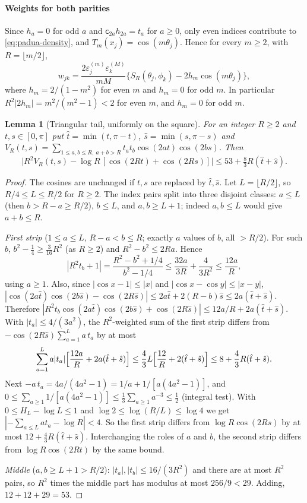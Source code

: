 \documentclass[preprint,12pt,a4paper]{elsarticle}
\newtheorem{lemma}[theorem]{Lemma}
\theoremstyle{remark}
\begin{document}
\paragraph{Weights for both parities}
Since $h_a=0$ for odd $a$ and $\mathsf c_{2a}h_{2a}=t_a$ for $a\ge0$, only even
indices contribute to \eqref{eq:padua-density}, and
$T_m(x_j)=\cos(m\theta_j)$. Hence for every $m\ge2$, with
$R=\lfloor m/2\rfloor$,
\begin{equation}\label{eq:weight-both}
 w_{jk}=\frac{2\varepsilon^{(m)}_j\varepsilon^{(M)}_k}{mM}
 \bigl\{S_R(\theta_j,\phi_k)-2h_m\cos(m\theta_j)\bigr\},
\end{equation}
where $h_m=2/(1-m^2)$ for even $m$ and $h_m=0$ for odd $m$.
In particular $R^2|2h_m|=m^2/(m^2-1)<2$ for even $m$, and $h_m=0$ for odd $m$.

\begin{lemma}[Triangular tail, uniformly on the square]\label{lem:triangular-tail}
For an integer $R\ge2$ and $t,s\in[0,\pi]$ put $\hat t=\min(t,\pi-t)$,
$\hat s=\min(s,\pi-s)$ and
$V_R(t,s)=\sum_{1\le a,b\le R,\ a+b>R}t_at_b\cos(2at)\cos(2bs)$. Then
\[
 \bigl|R^2V_R(t,s)-\log R\,[\cos(2Rt)+\cos(2Rs)]\bigr|\le53+\tfrac83R(\hat t+\hat s).
\]
\end{lemma}
\begin{proof}
The cosines are unchanged if $t,s$ are replaced by $\hat t,\hat s$.
Let $L=\lfloor R/2\rfloor$, so $R/4\le L\le R/2$ for $R\ge2$. The index
pairs split into three disjoint classes: $a\le L$ (then $b>R-a\ge R/2$),
$b\le L$, and $a,b\ge L+1$; indeed $a,b\le L$ would give $a+b\le R$.

\emph{First strip} ($1\le a\le L$, $R-a<b\le R$; exactly $a$ values of $b$,
all $>R/2$). For such $b$, $b^2-\frac14\ge\frac3{16}R^2$ (as $R\ge2$) and
$R^2-b^2\le2Ra$. Hence
\[
 |R^2t_b+1|=\frac{R^2-b^2+1/4}{b^2-1/4}\le\frac{32a}{3R}+\frac4{3R^2}\le\frac{12a}R ,
\]
using $a\ge1$. Also, since $|\cos x-1|\le|x|$ and $|\cos x-\cos y|\le|x-y|$,
$|\cos(2a\hat t)\cos(2b\hat s)-\cos(2R\hat s)|\le2a\hat t+2(R-b)\hat s\le2a(\hat t+\hat s)$.
Therefore
$|R^2t_b\cos(2a\hat t)\cos(2b\hat s)+\cos(2R\hat s)|\le12a/R+2a(\hat t+\hat s)$.
With $|t_a|\le4/(3a^2)$, the $R^2$-weighted sum of the first strip differs
from $-\cos(2R\hat s)\sum_{a=1}^La\,t_a$ by at most
\[
 \sum_{a=1}^La|t_a|\Bigl[\frac{12a}R+2a(\hat t+\hat s)\Bigr]
 \le\frac43L\Bigl[\frac{12}R+2(\hat t+\hat s)\Bigr]\le8+\frac43R(\hat t+\hat s).
\]
Next $-a\,t_a=4a/(4a^2-1)=1/a+1/[a(4a^2-1)]$, and
$0\le\sum_{a\ge1}1/[a(4a^2-1)]\le\frac13\sum_{a\ge1}a^{-3}\le\frac12$
(integral test). With $0\le H_L-\log L\le1$ and
$\log2\le\log(R/L)\le\log4$ we get $|-\sum_{a\le L}at_a-\log R|<4$.
So the first strip differs from $\log R\cos(2Rs)$ by at most
$12+\frac43R(\hat t+\hat s)$. Interchanging the roles of $a$ and $b$, the
second strip differs from $\log R\cos(2Rt)$ by the same bound.

\emph{Middle} ($a,b\ge L+1>R/2$): $|t_a|,|t_b|\le16/(3R^2)$ and there are at
most $R^2$ pairs, so $R^2$ times the middle part has modulus at most
$256/9<29$. Adding, $12+12+29=53$.
\end{proof}
\end{document}
